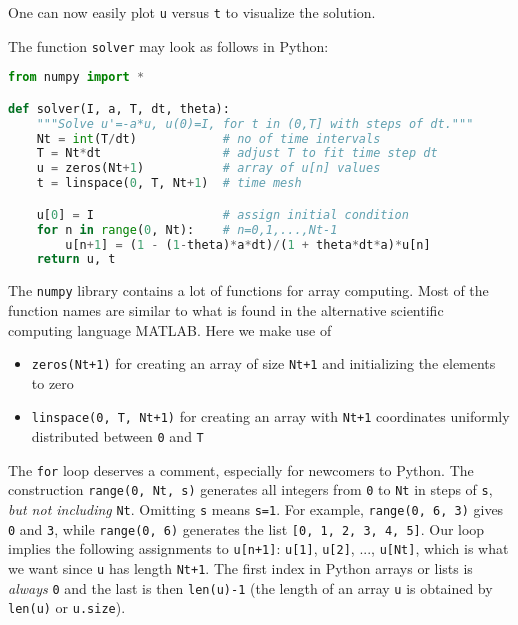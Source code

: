 \documentclass[graybox,sectrefs,envcountresetchap,open=right,final]{svmonodo}
\begin{document}
One can now easily plot \texttt{u} versus \texttt{t} to visualize the solution.

The function \texttt{solver} may look as follows in Python:















\begin{lstlisting}[language=python,style=blue1_bluegreen]
from numpy import *

def solver(I, a, T, dt, theta):
    """Solve u'=-a*u, u(0)=I, for t in (0,T] with steps of dt."""
    Nt = int(T/dt)            # no of time intervals
    T = Nt*dt                 # adjust T to fit time step dt
    u = zeros(Nt+1)           # array of u[n] values
    t = linspace(0, T, Nt+1)  # time mesh

    u[0] = I                  # assign initial condition
    for n in range(0, Nt):    # n=0,1,...,Nt-1
        u[n+1] = (1 - (1-theta)*a*dt)/(1 + theta*dt*a)*u[n]
    return u, t

\end{lstlisting}


The \texttt{numpy} library contains a lot of functions for array computing. Most
of the function names are similar to what is found
in the alternative scientific computing language MATLAB. Here
we make use of

\begin{itemize}
 \item \texttt{zeros(Nt+1)} for creating an array of size \texttt{Nt+1} and initializing the elements to zero

 \item \texttt{linspace(0, T, Nt+1)} for creating an array with \texttt{Nt+1} coordinates uniformly distributed between \texttt{0} and \texttt{T}
\end{itemize}

\noindent
The \texttt{for} loop deserves a comment, especially for newcomers to Python.
The construction \texttt{range(0, Nt, s)} generates all integers from \texttt{0} to \texttt{Nt}
in steps of \texttt{s}, \emph{but not including} \texttt{Nt}. Omitting \texttt{s} means \texttt{s=1}.
For example, \texttt{range(0, 6, 3)}
gives \texttt{0} and \texttt{3}, while \texttt{range(0, 6)} generates
the list \texttt{[0, 1, 2, 3, 4, 5]}.
Our loop implies the following assignments to \texttt{u[n+1]}: \texttt{u[1]}, \texttt{u[2]}, ...,
\texttt{u[Nt]}, which is what we want since \texttt{u} has length \texttt{Nt+1}.
The first index in Python arrays or lists is \emph{always} \texttt{0} and the
last is then \texttt{len(u)-1} (the length of an array \texttt{u} is obtained by
\texttt{len(u)} or \texttt{u.size}).
\end{document}
